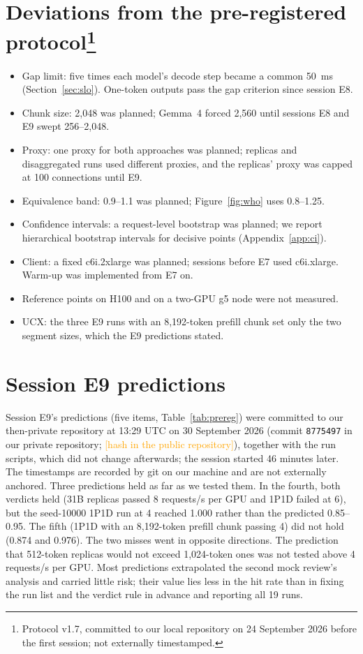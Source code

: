 \documentclass[11pt]{article}
\newcommand{\todo}[1]{\textcolor{orange}{[#1]}}
\begin{document}
\section[Deviations from the pre-registered protocol]{Deviations from the pre-registered protocol\protect\footnote{Protocol v1.7, committed to our local repository on 24 September 2026 before the first session; not externally timestamped.}}\label{app:dev}
\begin{itemize}
  \item Gap limit: five times each model's decode step became a common 50~ms (Section~\ref{sec:slo}). One-token outputs pass the gap criterion since session E8.
  \item Chunk size: 2,048 was planned; Gemma~4 forced 2,560 until sessions E8 and E9 swept 256--2,048.
  \item Proxy: one proxy for both approaches was planned; replicas and disaggregated runs used different proxies, and the replicas' proxy was capped at 100 connections until E9.
  \item Equivalence band: 0.9--1.1 was planned; Figure~\ref{fig:who} uses 0.8--1.25.
  \item Confidence intervals: a request-level bootstrap was planned; we report hierarchical bootstrap intervals for decisive points (Appendix~\ref{app:ci}).
  \item Client: a fixed c6i.2xlarge was planned; sessions before E7 used c6i.xlarge. Warm-up was implemented from E7 on.
  \item Reference points on H100 and on a two-GPU g5 node were not measured.
  \item UCX: the three E9 runs with an 8,192-token prefill chunk set only the two segment sizes, which the E9 predictions stated.
\end{itemize}

\section{Session E9 predictions}\label{app:prereg}
Session E9's predictions (five items, Table~\ref{tab:prereg}) were committed to our then-private repository at 13:29 UTC on 30 September 2026 (commit \texttt{8775497} in our private repository; \todo{hash in the public repository}), together with the run scripts, which did not change afterwards; the session started 46 minutes later. The timestamps are recorded by git on our machine and are not externally anchored. Three predictions held as far as we tested them. In the fourth, both verdicts held (31B replicas passed 8 requests/s per GPU and 1P1D failed at 6), but the seed-10000 1P1D run at 4 reached 1.000 rather than the predicted 0.85--0.95. The fifth (1P1D with an 8,192-token prefill chunk passing 4) did not hold (0.874 and 0.976). The two misses went in opposite directions. The prediction that 512-token replicas would not exceed 1,024-token ones was not tested above 4 requests/s per GPU. Most predictions extrapolated the second mock review's analysis and carried little risk; their value lies less in the hit rate than in fixing the run list and the verdict rule in advance and reporting all 19 runs.
\end{document}
